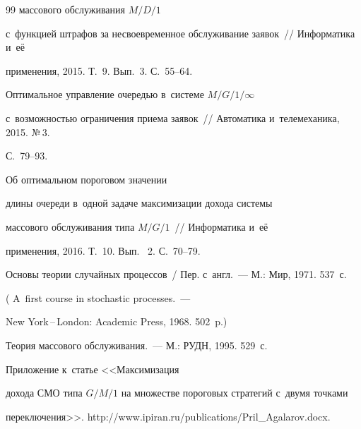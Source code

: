 {{\begin{thebibliography}{99}
массового обслуживания $M/D/1$ 


с~функцией штрафов за несвоевременное обслуживание заявок~/\!\!/ Информатика и~её 


применения, 2015. Т.~9. Вып.~3. С.~55--64.




 Оптимальное управление очередью в~системе $M/G/1/\infty$ 


с~возможностью ограничения приема заявок~/\!\!/ Автоматика и~телемеханика, 2015. №\,3. 


С.~79--93.




 Об оптимальном пороговом значении 


длины очереди в~одной задаче максимизации дохода системы


массового обслуживания типа $M/G/1$~/\!\!/ Информатика и~её 


применения, 2016. Т.~10. Вып.~ 2. С.~70--79.







 Основы теории случайных процессов~/ Пер. с~англ.~--- М.: Мир, 1971. 537~с.


( A~first course in stochastic processes.~---  


New York\,--\,London: Academic Press, 1968. 502~p.) 




 Теория массового обслуживания.~--- М.: РУДН, 1995. 529~с.




 Приложение к~статье <<Максимизация 


дохода СМО типа $G/M/1$ на множестве пороговых стратегий с~двумя точками 


переключения>>. {\sf http://www.ipiran.ru/publications/Pril\_Agalarov.docx}.


       \end{thebibliography}


} }








\vspace*{-3pt}





